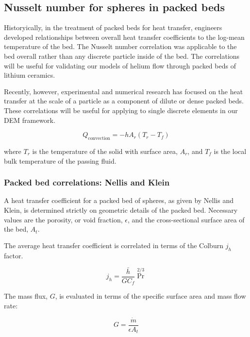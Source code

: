 \subsection{Nusselt number for spheres in packed beds}\label{sec:particle-convection}

Historyically, in the treatment of packed beds for heat transfer, engineers developed relationships between overall heat transfer coefficients to the log-mean temperature of the bed. The Nusselt number correlation was applicable to the bed overall rather than any discrete particle inside of the bed. The correlations will be useful for validating our models of helium flow through packed beds of lithium ceramics.


Recently, however, experimental and numerical research has focused on the heat transfer at the scale of a particle as a component of dilute or dense packed beds. These correlations will be useful for applying to single discrete elements in our DEM framework.

\begin{equation}
	Q_\text{convection} = -hA_r(T_r-T_f)
\end{equation}

where $T_r$ is the temperature of the solid with surface area, $A_r$, and $T_f$ is the local bulk temperature of the passing fluid.

\subsubsection{Packed bed correlations: Nellis and Klein}

A heat transfer coefficient for a packed bed of spheres, as given by Nellis and Klein, is determined strictly on geometric details of the packed bed.  Necessary values are the porosity, or void fraction, $\epsilon$, and the cross-sectional surface area of the bed, $A_t$.

The average heat transfer coefficient is correlated in terms of the Colburn $j_h$ factor.

\begin{equation}
	j_h=\frac{\bar{h}}{G C_f} \Pr^{2/3}
\end{equation}

The mass flux, $G$, is evaluated in terms of the specific surface area and mass flow rate:

\begin{equation}
	G=\frac{\dot{m}}{\epsilon A_t}
\end{equation}


